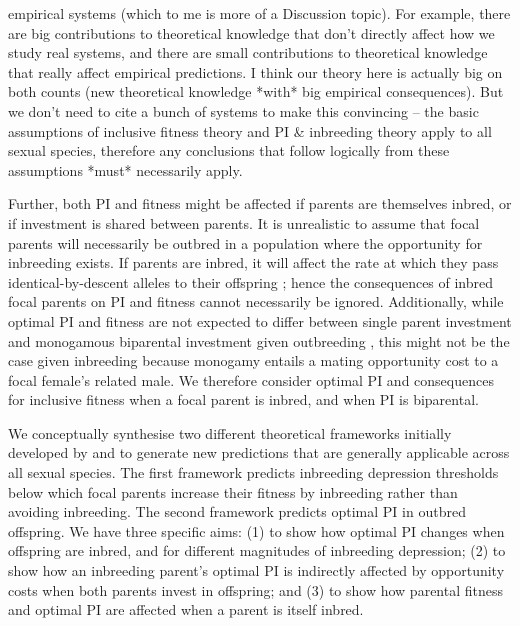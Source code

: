 \documentclass[12pt]{article}
\begin{document}
empirical systems (which to me is more of a Discussion topic). For example, there are big contributions to theoretical knowledge that don't directly affect how we study real systems, and there are small contributions to theoretical knowledge that really affect empirical predictions. I think our theory here is actually big on both counts (new theoretical knowledge *with* big empirical consequences). But we don't need to cite a bunch of systems to make this convincing -- the basic assumptions of inclusive fitness theory and PI & inbreeding theory apply to all sexual species, therefore any conclusions that follow logically from these assumptions *must* necessarily apply. 


Further, both PI and fitness might be affected if parents are themselves inbred, or if investment is shared between parents. It is unrealistic to assume that focal parents will necessarily be outbred in a population where the opportunity for inbreeding exists. If parents are inbred, it will affect the rate at which they pass identical-by-descent alleles to their offspring \cite[e.g.,][]{Duthie2015a}; hence the consequences of inbred focal parents on PI and fitness cannot necessarily be ignored. Additionally, while optimal PI and fitness are not expected to differ between single parent investment and monogamous biparental investment given outbreeding \cite[][]{Parker1985}, this might not be the case given inbreeding because monogamy entails a mating opportunity cost \cite[][]{Waser1986} to a focal female's related male. We therefore consider optimal PI and consequences for inclusive fitness when a focal parent is inbred, and when PI is biparental.


We conceptually synthesise two different theoretical frameworks initially developed by \cite{Parker1979} and \cite{Macnair1978} to generate new predictions that are generally applicable across all sexual species. The first framework \cite[][]{Parker1979} predicts inbreeding depression thresholds below which focal parents increase their fitness by inbreeding rather than avoiding inbreeding. The second framework \cite[][]{Macnair1978} predicts optimal PI in outbred offspring. We have three specific aims: (1) to show how optimal PI changes when offspring are inbred, and for different magnitudes of inbreeding depression; (2) to show how an inbreeding parent's optimal PI is indirectly affected by opportunity costs when both parents invest in offspring; and (3) to show how parental fitness and optimal PI are affected when a parent is itself inbred.
\end{document}
